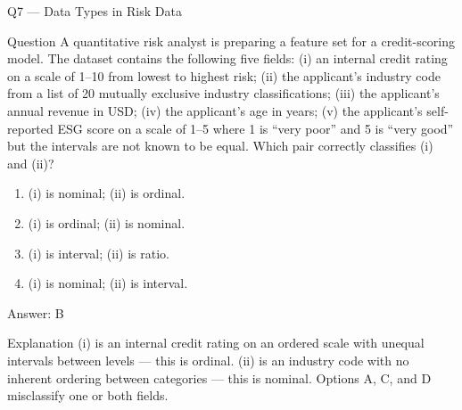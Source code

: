 \documentclass[aspectratio=169,8pt]{beamer}
\begin{document}
	\begin{frame}{Q7 --- Data Types in Risk Data}
		\begin{block}{Question}
			A quantitative risk analyst is preparing a feature set for a credit-scoring model. The dataset contains the following five fields: (i) an internal credit rating on a scale of 1--10 from lowest to highest risk; (ii) the applicant's industry code from a list of 20 mutually exclusive industry classifications; (iii) the applicant's annual revenue in USD; (iv) the applicant's age in years; (v) the applicant's self-reported ESG score on a scale of 1--5 where 1 is ``very poor'' and 5 is ``very good'' but the intervals are not known to be equal. Which pair correctly classifies (i) and (ii)?
		\end{block}
		\begin{enumerate}
			\item (i) is nominal; (ii) is ordinal.
			\item (i) is ordinal; (ii) is nominal.
			\item (i) is interval; (ii) is ratio.
			\item (i) is nominal; (ii) is interval.
		\end{enumerate}
		\begin{exampleblock}{Answer: B}\end{exampleblock}
		\begin{block}{Explanation}
			(i) is an internal credit rating on an ordered scale with unequal intervals between levels --- this is ordinal. (ii) is an industry code with no inherent ordering between categories --- this is nominal. Options A, C, and D misclassify one or both fields.
		\end{block}
	\end{frame}
	
\end{document}
